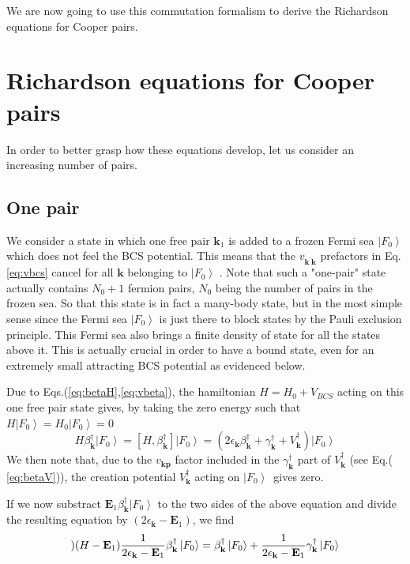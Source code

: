 \documentclass[aps,prb,superscriptaddress,twocolumn]{revtex4}
\newcommand{\vk}{\ensuremath{\mathbf{k}}}
\begin{document}
We are now going to use this commutation formalism to derive the Richardson
equations for Cooper pairs.

\section{Richardson equations for Cooper pairs\label{sec:rich}}

In order to better grasp how these equations develop, let us consider an
increasing number of pairs.

\subsection{One pair}

We consider a state in which one free pair $\mathbf{k} _1$ is added to a
frozen Fermi sea $\left|F_0\right> $ which does not feel the BCS potential.
This means that the $v_{\mathbf{k} ^{\prime}\mathbf{k} }$ prefactors in Eq.%
\eqref{eq:vbcs} cancel for all $\mathbf{k} $ belonging to $\left|F_0\right> $%
. Note that such a "one-pair" state actually contains $N_0+1$ fermion pairs, 
$N_0$ being the number of pairs in the frozen sea. So that this state is in
fact a many-body state, but in the most simple sense since the Fermi sea $%
\left|F_0\right> $ is just there to block states by the Pauli exclusion
principle. This Fermi sea also brings a finite density of state for all the
states above it. This is actually crucial in order to have a bound state,
even for an extremely small attracting BCS potential as evidenced below.

Due to Eqs.(\ref{eq:betaH},\ref{eq:vbeta}), the hamiltonian $H=H_0+V_{BCS}$
acting on this one free pair state gives, by taking the zero energy such
that $H\left|F_0\right> =H_0\left|F_0\right> =0$ 
\begin{equation}
H\beta^{\dagger}_\vk\left|F_0\right>  =\left[H,\beta^{\dagger}_\vk\right] 
\left|F_0\right> 
=\left(2\epsilon_\vk\beta^{\dagger}_\vk+\gamma^{\dagger}_\vk+V^{\dagger}_\vk%
\right) \left|F_0\right>  
\end{equation}
We then note that, due to the $v_{\mathbf{k} \mathbf{p} }$ factor included
in the $\gamma^{\dagger}_{\mathbf{k} }$ part of $V^{\dagger}_\vk$ (see Eq.(%
\ref{eq:betaV})), the creation potential $V^{\dagger}_\vk$ acting on $%
\left|F_0\right> ${\ }gives zero.

If we now substract $\mathbf{E} _1\beta^{\dagger}_\vk\left|F_0\right>  $ to
the two sides of the above equation and divide the resulting equation by $%
\left(2\epsilon_\vk-\mathbf{E} _1\right) $, we find 
\begin{equation}  \label{eq:HE1}
) (H-\mathbf{E} _1)\frac{1}{2\epsilon_\vk-\mathbf{E} _1} \beta^{\dagger}_\vk%
\left|F_0\right>  =\beta^{\dagger}_\vk\left|F_0\right>  +\frac{1}{%
2\epsilon_\vk-\mathbf{E} _1} \gamma^{\dagger}_\vk\left|F_0\right>  
\end{equation}
\end{document}
